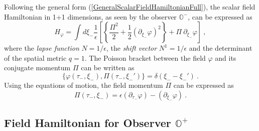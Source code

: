 \documentclass[aps,twocolumn,showpacs]{revtex4}
\def\observerminus{\mathbb{O}^{-}}
\def\observerplus{\mathbb{O}^{+}}
\begin{document}
Following the general form (\ref{GeneralScalarFieldHamiltonianFull}),
the scalar field Hamiltonian in 1+1 dimensions, as seen by the observer 
$\observerminus$, can be expressed as
%
\begin{equation}\label{ScalarHamiltonianFullMinus}
H_{\varphi} = \int d\xi_{-}  \frac{1}{\epsilon}  \left[
\left\{ \frac{\Pi^2}{2}  + \frac{1}{2}  (\partial_{\xi_{-}}\varphi)^2 \right\} 
+ \Pi~ \partial_{\xi_{-}} \varphi \right] ~,
\end{equation}
%
where the \emph{lapse function} $N = 1/\epsilon$, the \emph{shift vector} $N^1 = 
1/\epsilon$ and the determinant of the spatial metric $q = 1$. The Poisson 
bracket between the field $\varphi$ and its conjugate momentum $\Pi$ can be 
written as
%
\begin{equation}\label{PoissonBracketMinus}
\{\varphi(\tau_{-},\xi_{-}), \Pi(\tau_{-},\xi_{-}')\} 
= \delta(\xi_{-} - \xi_{-}') ~.
\end{equation}
%
Using the equations of motion, the field momentum $\Pi$ can be expressed 
as 
%
\begin{equation}\label{FieldMomentumMinus}
\Pi(\tau_{-},\xi_{-}) = \epsilon (\partial_{\tau_{-}}\varphi) - 
(\partial_{\xi_{-}}\varphi) ~.
\end{equation}
%





\subsection{Field Hamiltonian for Observer $\observerplus$}
\end{document}
